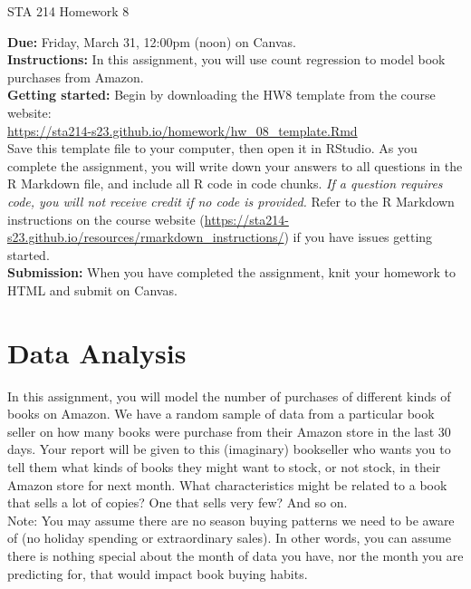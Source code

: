 \documentclass[11pt]{article}
\begin{document}
\begin{center}
\Large
STA 214 Homework 8\\
\normalsize
\vspace{5mm}
\end{center}

\noindent \textbf{Due:} Friday, March 31, 12:00pm (noon) on Canvas.\\ 

\noindent \textbf{Instructions:} In this assignment, you will use count regression to model book purchases from Amazon.\\

\noindent \textbf{Getting started:} Begin by downloading the HW8 template from the course website:\\

\url{https://sta214-s23.github.io/homework/hw_08_template.Rmd}\\

\noindent Save this template file to your computer, then open it in RStudio. As you complete the assignment, you will write down your answers to all questions in the R Markdown file, and include all R code in code chunks. \textit{If a question requires code, you will not receive credit if no code is provided.} Refer to the R Markdown instructions on the course website (\url{https://sta214-s23.github.io/resources/rmarkdown_instructions/}) if you have issues getting started.\\

\noindent \textbf{Submission:} When you have completed the assignment, knit your homework to HTML and submit on Canvas. 

\section*{Data Analysis}

In this assignment, you will model the number of purchases of different kinds of books on Amazon. We have a random sample of data from a particular book seller on how many books were purchase from their Amazon store in the last 30 days. Your report will be given to this (imaginary) bookseller who wants you to tell them what kinds of books they might want to stock, or not stock, in their Amazon store for next month. What characteristics might be related to a book that sells a lot of copies? One that sells very few? And so on.\\

\noindent Note: You may assume there are no season buying patterns we need to be aware of (no holiday spending or extraordinary sales). In other words, you can assume there is nothing special about the month of data you have, nor the month you are predicting for, that would impact book buying habits.
\end{document}
